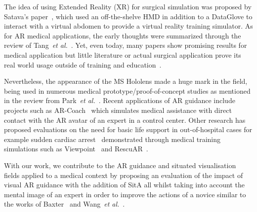 The idea of using Extended Reality (XR) for surgical simulation was proposed by Satava's paper~\cite{satava1993virtual}, which used an off-the-shelve HMD in addition to a DataGlove to interact with a virtual abdomen to provide a virtual reality training simulator.
As for AR medical applications, the early thoughts were summarized through the review of Tang~\textit{et al.}~\cite{tang1998augmented}.
Yet, even today, many papers show promising results for medical application but little literature or actual surgical application prove its real world usage outside of training and education~\cite{barsom2016systematic,chen2017recent,eckert2019augmented,tang2020augmented}.

Nevertheless, the appearance of the MS Hololens made a huge mark in the field, being used in numerous medical prototype/proof-of-concept studies as mentioned in the review from Park~\textit{et al.}~\cite{park2021review}.
Recent applications of AR guidance include projects such as AR-Coach~\cite{ebnali2022ar} which simulates medical assistance with direct contact with the AR avatar of an expert in a control center.
Other research has proposed evaluations on the need for basic life support in out-of-hospital cases for example sudden cardiac arrest~\cite{9978596,info:doi/10.2196/14910} demonstrated through medical training simulations such as Viewpoint~\cite{info:doi/10.2196/28595} and RescuAR~\cite{javaheri2023rescuar}.

With our work, we contribute to the AR guidance and situated visualisation fields applied to a medical context by proposing an evaluation of the impact of visual AR guidance with the addition of SitA all whilst taking into account the mental image of an expert in order to improve the actions of a novice similar to the works of Baxter~\cite{baxter2012human} and Wang~\textit{et al.}~\cite{wang2021role}.